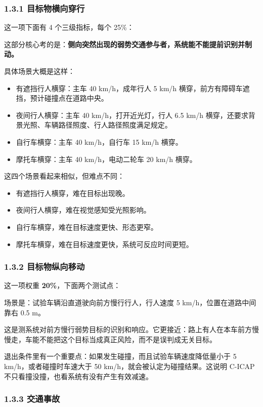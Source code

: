 \subsubsection{1.3.1 目标物横向穿行}

这一项下面有 4 个三级指标，每个 25\%：

这部分核心考的是：\textbf{侧向突然出现的弱势交通参与者，系统能不能提前识别并制动。}

具体场景大概是这样：

\begin{itemize}
  \item 有遮挡行人横穿：主车 40 km/h，成年行人 5 km/h 横穿，前方有障碍车遮挡，预计碰撞点在道路中央。
  \item 夜间行人横穿：主车 40 km/h，打开近光灯，行人 6.5 km/h 横穿，还要求背景光照、车辆路径照度、行人路径照度满足规定。
  \item 自行车横穿：主车 40 km/h，自行车 15 km/h 横穿。
  \item 摩托车横穿：主车 40 km/h，电动二轮车 20 km/h 横穿。
\end{itemize}

这四个场景看起来相似，但难点不同：

\begin{itemize}
  \item 有遮挡行人横穿，难在目标出现晚。
  \item 夜间行人横穿，难在视觉感知受光照影响。
  \item 自行车横穿，难在目标速度更快、形态更窄。
  \item 摩托车横穿，难在目标速度更快，系统可反应时间更短。
\end{itemize}

\subsubsection{1.3.2 目标物纵向移动}

这一项权重 \textbf{20\%}，下面两个测试点：

场景是：试验车辆沿直道驶向前方慢行行人，行人速度 5 km/h，位置在道路中间靠右 0.5 m。

这是测系统对前方慢行弱势目标的识别和响应。它更接近：路上有人在本车前方慢慢走，车能不能把这个目标当成真正风险，而不是误判成无关目标。

退出条件里有一个重要点：如果发生碰撞，而且试验车辆速度降低量小于 5 km/h，或者碰撞时车速大于 50 km/h，就会被认定为碰撞结果。这说明 C-ICAP 不只看撞没撞，也看系统有没有产生有效减速。

\subsubsection{1.3.3 交通事故}

